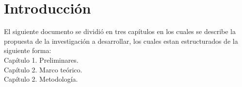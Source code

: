 

\chapter*{Introducci\'on}

El siguiente documento se dividi\'o en tres cap\'itulos en los cuales se describe la propuesta de la investigaci\'on a desarrollar, los cuales estan estructurados de la siguiente forma:\\

Capítulo 1. Preliminares.\\
Capítulo 2. Marco teórico.\\
Capítulo 2. Metodolog\'ia.\\
